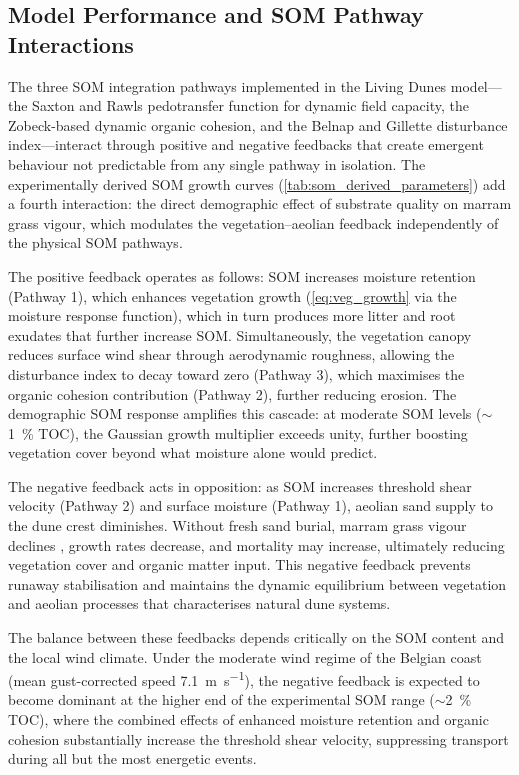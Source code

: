 \documentclass[authoryear,preprint,review,12pt]{elsarticle}
\begin{document}
\subsection{Model Performance and SOM Pathway Interactions}

The three SOM integration pathways implemented in the Living Dunes model---the Saxton and Rawls pedotransfer function for dynamic field capacity, the Zobeck-based dynamic organic cohesion, and the Belnap and Gillette disturbance index---interact through positive and negative feedbacks that create emergent behaviour not predictable from any single pathway in isolation. The experimentally derived SOM growth curves (\cref{tab:som_derived_parameters}) add a fourth interaction: the direct demographic effect of substrate quality on marram grass vigour, which modulates the vegetation--aeolian feedback independently of the physical SOM pathways.

The positive feedback operates as follows: SOM increases moisture retention (Pathway 1), which enhances vegetation growth (\cref{eq:veg_growth} via the moisture response function), which in turn produces more litter and root exudates that further increase SOM. Simultaneously, the vegetation canopy reduces surface wind shear through aerodynamic roughness, allowing the disturbance index to decay toward zero (Pathway 3), which maximises the organic cohesion contribution (Pathway 2), further reducing erosion. The demographic SOM response amplifies this cascade: at moderate SOM levels ($\sim$1~\% TOC), the Gaussian growth multiplier exceeds unity, further boosting vegetation cover beyond what moisture alone would predict.

The negative feedback acts in opposition: as SOM increases threshold shear velocity (Pathway 2) and surface moisture (Pathway 1), aeolian sand supply to the dune crest diminishes. Without fresh sand burial, marram grass vigour declines \citep{vanderputten1993plant}, growth rates decrease, and mortality may increase, ultimately reducing vegetation cover and organic matter input. This negative feedback prevents runaway stabilisation and maintains the dynamic equilibrium between vegetation and aeolian processes that characterises natural dune systems.

The balance between these feedbacks depends critically on the SOM content and the local wind climate. Under the moderate wind regime of the Belgian coast (mean gust-corrected speed \SI{7.1}{\metre\per\second}), the negative feedback is expected to become dominant at the higher end of the experimental SOM range ($\sim$\SI{2}{\percent} TOC), where the combined effects of enhanced moisture retention and organic cohesion substantially increase the threshold shear velocity, suppressing transport during all but the most energetic events.
\end{document}
